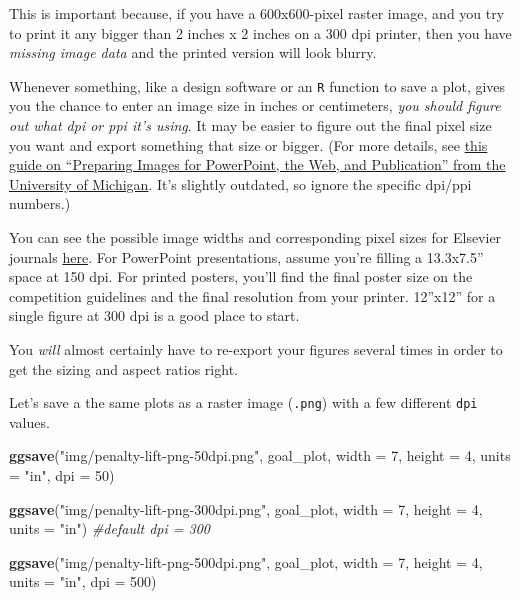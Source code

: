 \documentclass[
]{book}
\newenvironment{Shaded}{\begin{snugshade}}{\end{snugshade}}
\newcommand{\AttributeTok}[1]{\textcolor[rgb]{0.13,0.29,0.53}{#1}}
\newcommand{\CommentTok}[1]{\textcolor[rgb]{0.56,0.35,0.01}{\textit{#1}}}
\newcommand{\DecValTok}[1]{\textcolor[rgb]{0.00,0.00,0.81}{#1}}
\newcommand{\FunctionTok}[1]{\textcolor[rgb]{0.13,0.29,0.53}{\textbf{#1}}}
\newcommand{\NormalTok}[1]{#1}
\newcommand{\StringTok}[1]{\textcolor[rgb]{0.31,0.60,0.02}{#1}}
\begin{document}
This is important because, if you have a 600x600-pixel raster image, and you try to print it any bigger than 2 inches x 2 inches on a 300 dpi printer, then you have \emph{missing image data} and the printed version will look blurry.

Whenever something, like a design software or an \texttt{R} function to save a plot, gives you the chance to enter an image size in inches or centimeters, \emph{you should figure out what dpi or ppi it's using}. It may be easier to figure out the final pixel size you want and export something that size or bigger. (For more details, see \href{https://apps.lib.umich.edu/files/services/exploratory/pdfs/preparingimages.pdf}{this guide on ``Preparing Images for PowerPoint, the Web, and Publication'' from the University of Michigan}. It's slightly outdated, so ignore the specific dpi/ppi numbers.)

You can see the possible image widths and corresponding pixel sizes for Elsevier journals \href{https://www.elsevier.com/about/policies-and-standards/author/artwork-and-media-instructions/artwork-sizing}{here}. For PowerPoint presentations, assume you're filling a 13.3x7.5'' space at 150 dpi. For printed posters, you'll find the final poster size on the competition guidelines and the final resolution from your printer. 12''x12'' for a single figure at 300 dpi is a good place to start.

You \emph{will} almost certainly have to re-export your figures several times in order to get the sizing and aspect ratios right.

Let's save a the same plots as a raster image (\texttt{.png}) with a few different \texttt{dpi} values.

\begin{Shaded}
\begin{Highlighting}[]
\FunctionTok{ggsave}\NormalTok{(}\StringTok{"img/penalty{-}lift{-}png{-}50dpi.png"}\NormalTok{, goal\_plot,}
       \AttributeTok{width =} \DecValTok{7}\NormalTok{, }\AttributeTok{height =} \DecValTok{4}\NormalTok{, }\AttributeTok{units =} \StringTok{"in"}\NormalTok{, }\AttributeTok{dpi =} \DecValTok{50}\NormalTok{)}

\FunctionTok{ggsave}\NormalTok{(}\StringTok{"img/penalty{-}lift{-}png{-}300dpi.png"}\NormalTok{, goal\_plot,}
       \AttributeTok{width =} \DecValTok{7}\NormalTok{, }\AttributeTok{height =} \DecValTok{4}\NormalTok{, }\AttributeTok{units =} \StringTok{"in"}\NormalTok{) }\CommentTok{\#default dpi = 300}

\FunctionTok{ggsave}\NormalTok{(}\StringTok{"img/penalty{-}lift{-}png{-}500dpi.png"}\NormalTok{, goal\_plot,}
       \AttributeTok{width =} \DecValTok{7}\NormalTok{, }\AttributeTok{height =} \DecValTok{4}\NormalTok{, }\AttributeTok{units =} \StringTok{"in"}\NormalTok{, }\AttributeTok{dpi =} \DecValTok{500}\NormalTok{)}
\end{Highlighting}
\end{Shaded}
\end{document}
